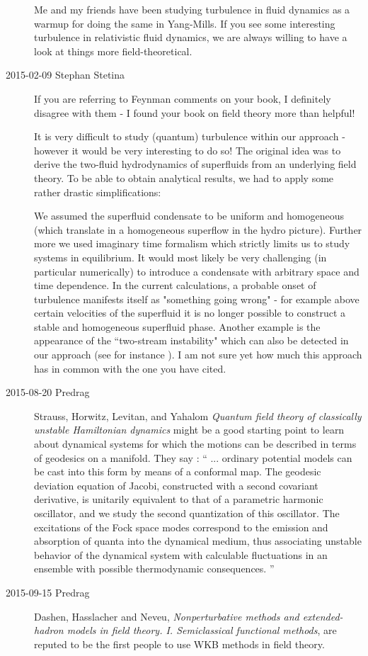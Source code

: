 \begin{description}
Me and my friends have been studying turbulence in fluid dynamics as a
warmup for doing the same in Yang-Mills. If you see some interesting
turbulence in relativistic fluid dynamics, we are always willing to have
a look at things more field-theoretical.



\item[2015-02-09 Stephan Stetina]
If you are referring to Feynman comments on your book, I definitely disagree
with them - I found your book on field theory more than helpful!

It is very difficult to study (quantum) turbulence within our approach -
however it would be very interesting to do so! The original idea was to
derive the two-fluid hydrodynamics of superfluids from an underlying
field theory. To be able to obtain analytical results, we had to apply
some rather drastic simplifications:

We assumed the superfluid condensate to be uniform and homogeneous (which
translate in a homogeneous superflow in the hydro picture). Further more
we used imaginary time formalism which strictly limits us to study
systems in equilibrium. It would most likely be very challenging (in
particular numerically) to introduce a condensate with arbitrary space
and time dependence. In the current calculations, a probable onset of
turbulence manifests itself as "something going wrong" - for example
above certain velocities of the superfluid it is no longer possible to
construct a stable and homogeneous superfluid phase. Another example is
the appearance of the ``two-stream instability" which can also be detected
in our approach (see for instance ).
I am not sure yet how much this approach has in common with the one you
have cited.

\item[2015-08-20 Predrag]
Strauss, Horwitz, Levitan, and Yahalom
{\em Quantum field theory of classically unstable {Hamiltonian} dynamics}
might be a good starting point to learn about dynamical systems for which
the motions can be described in terms of geodesics on a manifold. They
say : ``
... ordinary potential models can be cast into this form by means of a
conformal map. The geodesic deviation equation of Jacobi, constructed
with a second covariant derivative, is unitarily equivalent to that of a
parametric harmonic oscillator, and we study the second quantization of
this oscillator. The excitations of the Fock space modes correspond to
the emission and absorption of quanta into the dynamical medium, thus
associating unstable behavior of the dynamical system with calculable
fluctuations in an ensemble with possible thermodynamic consequences.
''

\item[2015-09-15 Predrag]
Dashen, Hasslacher and Neveu,
\emph{Nonperturbative methods and extended-hadron models in field theory.
{I}. {Semiclassical} functional methods},
are reputed to be the first people to use WKB methods in field theory.


\end{description}







